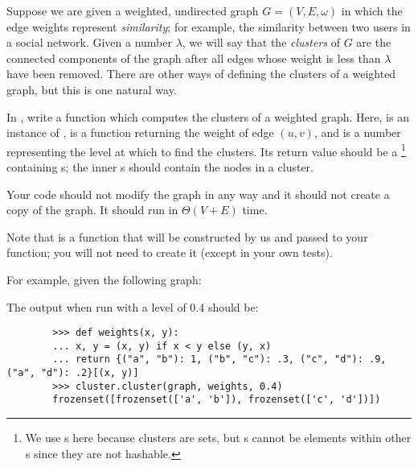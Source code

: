 \begin{progprob}
    Suppose we are given a weighted, undirected graph $G = (V, E, \omega)$ in
    which the edge weights represent \emph{similarity}; for example, the
    similarity between two users in a social network. Given a number $\lambda$,
    we will say that the \emph{clusters} of $G$ are the connected components of
    the graph after all edges whose weight is less than $\lambda$ have been
    removed. There are other ways of defining the clusters of a weighted graph,
    but this is one natural way.

    In , write a function  which computes the clusters of a weighted graph. Here,
     is an instance of ,
     is a function returning the weight of edge $(u, v)$,
    and  is a number representing the level at which to find the
    clusters. Its return value should be a \footnote{
        We use s here because clusters are sets, but s
        cannot be elements within other s since they are not hashable.
    }
    containing s;
    the inner s should contain the nodes in a cluster.

    Your code should not modify the graph in any way and it should not create a copy
    of the graph. It should run in $\Theta(V + E)$ time.

    Note that  is a function that will be constructed by us and
    passed to your function; you will not need to create it (except in your own
    tests).

    For example, given the following graph:


    The output when run with a level of 0.4 should be:

    \begin{verbatim}
        >>> def weights(x, y):
        ... x, y = (x, y) if x < y else (y, x)
        ... return {("a", "b"): 1, ("b", "c"): .3, ("c", "d"): .9, ("a", "d"): .2}[(x, y)]
        >>> cluster.cluster(graph, weights, 0.4)
        frozenset([frozenset(['a', 'b']), frozenset(['c', 'd'])])
    \end{verbatim}


\end{progprob}
